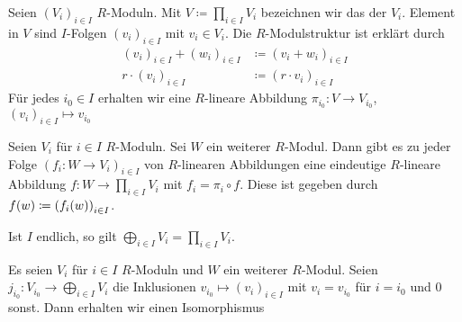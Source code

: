 \begin{definition}[{name=[Produkt von $R$-Moduln]}]
	Seien $(V_i)_{i \in I}$ $R$-Moduln. Mit $V \coloneqq \prod_{i \in I} V_i$ bezeichnen wir das  der $V_i$. Element in $V$ sind $I$-Folgen $(v_i)_{i \in I}$ mit 
	$v_i \in V_i$. Die $R$-Modulstruktur ist erklärt durch
	\begin{align}
		(v_i)_{i \in I}+ (w_i)_{i \in I} &\coloneqq (v_i + w_i)_{i \in I} \\
		r \cdot (v_i)_{i \in I} & \coloneqq (r \cdot v_i)_{i \in I}
	\end{align}
	Für jedes $i_0 \in I$ erhalten wir eine $R$-lineare Abbildung $\pi_{i_0} \colon V \to V_{i_0}$, $(v_i)_{i \in I} \mapsto v_{i_0}$
\end{definition}

\begin{bemerkung}[name={Universelle Eigenschaft des Produktes}]
	Seien $V_i$ für $i \in I$ $R$-Moduln. Sei $W$ ein weiterer $R$-Modul. Dann gibt es zu jeder Folge $(f_i\colon W \to V_i)_{i \in I}$ von $R$-linearen Abbildungen eine eindeutige 
	$R$-lineare Abbildung $f \colon W \to \prod_{i \in I}V_i$ mit $f_i= \pi_i \circ f$. Diese ist gegeben durch
	$f(w) \coloneqq \enbrace*{f_i(w)}_{i \in I}$.
\end{bemerkung}

\begin{bemerkung}[{name=[endliche Produkte]}]
	Ist $I$ endlich, so gilt
	\(
		\bigoplus_{i \in I} V_i = \prod_{i \in I} V_i.
	\)
\end{bemerkung}

\begin{bemerkung}[{name=[{Eigenschaften von $\Hom(-,W)$ mit Produkten}]},label=hom_funk_koprod]
	Es seien $V_i$ für $i \in I$ $R$-Moduln und $W$ ein weiterer $R$-Modul. 
	Seien $j_{i_0} \colon V_{i_0} \to\bigoplus_{i \in I}V_i$ die Inklusionen $v_{i_0}\mapsto (v_i)_{i \in I}$ mit $v_i =v_{i_0}$ für $i=i_0$ und $0$ sonst. 
	Dann erhalten wir einen Isomorphismus 
\end{bemerkung}

